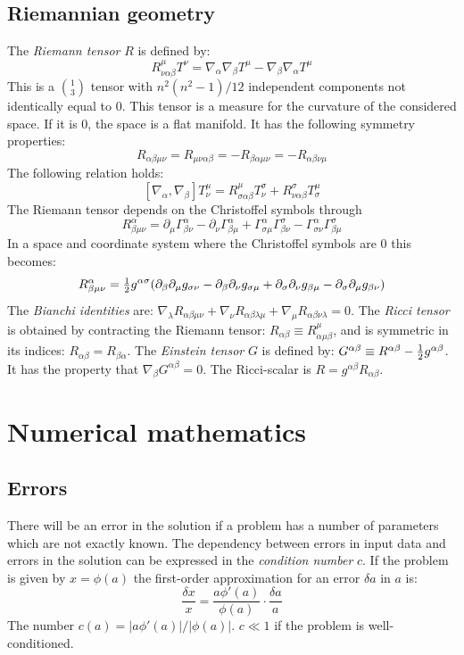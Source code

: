 \documentclass[twoside]{report}
\begin{document}
\section{Riemannian geometry}
The {\it Riemann tensor} $R$ is defined by:
\[
R^\mu_{\nu\alpha\beta}T^\nu=\nabla_\alpha\nabla_\beta T^\mu-\nabla_\beta\nabla_\alpha T^\mu
\]
This is a $1\choose 3$ tensor with $n^2(n^2-1)/12$ independent components not
identically equal to 0. This tensor is a measure for the curvature of the
considered space. If it is 0, the space is a flat manifold. It has the
following symmetry properties:
\[
R_{\alpha\beta\mu\nu}=R_{\mu\nu\alpha\beta}=-R_{\beta\alpha\mu\nu}=-R_{\alpha\beta\nu\mu}
\]
The following relation holds:
\[
[\nabla_\alpha,\nabla_\beta]T_\nu^\mu=R_{\sigma\alpha\beta}^\mu T_\nu^\sigma+R_{\nu\alpha\beta}^\sigma T_\sigma^\mu
\]
The Riemann tensor depends on the Christoffel symbols through
\[
R^\alpha_{\beta\mu\nu}=\partial_\mu\Gamma^\alpha_{\beta\nu}-\partial_\nu\Gamma^\alpha_{\beta\mu}+\Gamma^\alpha_{\sigma\mu}\Gamma^\sigma_{\beta\nu}-\Gamma^\alpha_{\sigma\nu}\Gamma^\sigma_{\beta\mu}
\]
In a space and coordinate system where the Christoffel symbols are 0 this
becomes:
\[
R^\alpha_{\beta\mu\nu}=\mbox{$\frac{1}{2}$} g^{\alpha\sigma}(\partial_\beta\partial_\mu g_{\sigma\nu}-\partial_\beta\partial_\nu g_{\sigma\mu}+\partial_\sigma\partial_\nu g_{\beta\mu}-\partial_\sigma\partial_\mu g_{\beta\nu})
\]
The {\it Bianchi identities} are: $\nabla_\lambda R_{\alpha\beta\mu\nu}+\nabla_\nu R_{\alpha\beta\lambda\mu} +\nabla_\mu R_{\alpha\beta\nu\lambda}=0$.
\npar
The {\it Ricci tensor} is obtained by contracting the Riemann tensor:
$R_{\alpha\beta}\equiv R_{\alpha\mu\beta}^\mu$, and is symmetric in its
indices: $R_{\alpha\beta}=R_{\beta\alpha}$. The {\it Einstein tensor} $G$ is
defined by: $G^{\alpha\beta}\equiv R^{\alpha\beta}-\mbox{$\frac{1}{2}$} g^{\alpha\beta}$.
It has the property that $\nabla_\beta G^{\alpha\beta}=0$. The Ricci-scalar is
$R=g^{\alpha\beta}R_{\alpha\beta}$.


\chapter{Numerical mathematics}
\label{chap:num}
\section{Errors}
There will be an error in the solution if a problem has a number of parameters
which are not exactly known. The dependency between errors in input data and
errors in the solution can be expressed in the {\it condition number} $c$. If
the problem is given by $x=\phi(a)$ the first-order approximation for an error
$\delta a$ in $a$ is:
\[
\frac{\delta x}{x}=\frac{a\phi'(a)}{\phi(a)}\cdot\frac{\delta a}{a}
\]
The number $c(a)=|a\phi'(a)|/|\phi(a)|$. $c\ll1$ if the problem is
well-conditioned.
\end{document}
